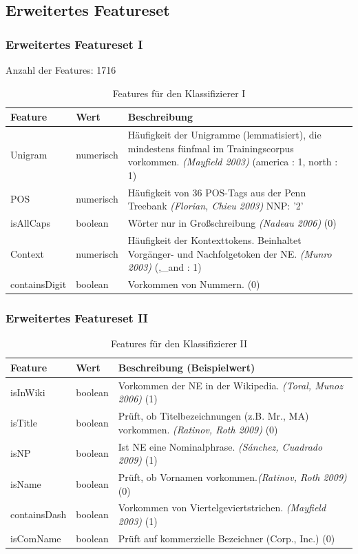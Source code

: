 \documentclass{beamer}
\begin{document}
	\subsection{Erweitertes Featureset}
	\begin{frame}
		\frametitle{Erweitertes Featureset I}
		Anzahl der Features: 1716
 			\begin{table}
 				\small
 				\caption{Features für den Klassifizierer I}
 				\begin{tabularx}{\textwidth}{llX}
 					\toprule
 					Feature & Wert & Beschreibung\\
 					\midrule
 					Unigram & numerisch & Häufigkeit der Unigramme (lemmatisiert), die mindestens fünfmal im Trainingscorpus vorkommen. \textit{(Mayfield 2003)} \color{red}(america : 1, north : 1)\\
 					POS & numerisch  & Häufigkeit von 36 POS-Tags aus der Penn Treebank \textit{(Florian, Chieu 2003)} \color{red}NNP: '2'\\
 					isAllCaps & boolean & Wörter nur in Großschreibung \textit{(Nadeau 2006)} \color{red} (0)\\
 					Context & numerisch & Häufigkeit der Kontexttokens. Beinhaltet Vorgänger- und Nachfolgetoken der NE. \textit{(Munro 2003)}  \color{red} (,\_and : 1)\\
 					containsDigit & boolean & Vorkommen von Nummern. \color{red} (0)\textit{}\\
 					\bottomrule
 				\end{tabularx}
 				\label{tab:allf1}
 			\end{table}
 	\end{frame}
 		\begin{frame}
 			\frametitle{Erweitertes Featureset II}
 					\begin{table}
 						\small
 						\caption{Features für den  Klassifizierer II}
 						\begin{tabularx}{\textwidth}{llX}
 							\toprule
 							Feature & Wert & Beschreibung (Beispielwert)\\
 							\midrule
 							isInWiki & boolean & Vorkommen der NE in der Wikipedia. \textit{(Toral, Munoz 2006)} \color{red} (1)\\
 							isTitle & boolean & Prüft, ob Titelbezeichnungen (z.B. Mr., MA) vorkommen. \textit{(Ratinov, Roth 2009)} (0)\\
 							isNP & boolean & Ist NE eine Nominalphrase. \textit{(Sánchez, Cuadrado 2009)} \color{red} (1)\\
 							isName & boolean & Prüft, ob Vornamen vorkommen.\textit{(Ratinov, Roth 2009)} \color{red}(0)\\
 							containsDash & boolean & Vorkommen von Viertelgeviertstrichen. \textit{(Mayfield 2003)} \color{red}(1) \\
 							isComName & boolean & Prüft auf kommerzielle Bezeichner (Corp., Inc.) \color{red} (0)\\
 							\bottomrule
 						\end{tabularx}
 						\label{tab:allf2}
 					\end{table}
 		\end{frame}
\end{document}
